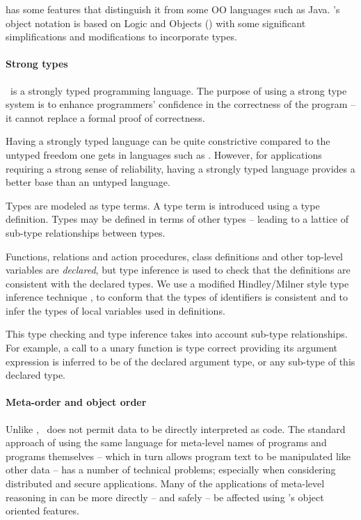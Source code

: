 \go has some features that distinguish it from some OO languages such as Java\tm. \go's object notation is based on Logic and Objects (\cite{fgm:92}) with some significant simplifications and modifications to incorporate types. 

\paragraph{Strong types}
\go\ is a strongly typed programming language. The purpose of using a strong type system is to enhance programmers' confidence in the correctness of the program -- it cannot replace a formal proof of correctness.

Having a strongly typed language can be quite constrictive compared to the untyped freedom one gets in languages such as \prolog.  However, for applications requiring a strong sense of reliability, having a strongly typed language provides a better base than an untyped language.

Types are modeled as type terms. A type term is introduced using a type definition. Types may be defined in terms of other types -- leading to a lattice of sub-type relationships between types. 

Functions, relations and action procedures, class definitions and other top-level variables are \emph{declared}, but type inference is used to check that the definitions are consistent with the declared types. We use a modified Hindley/Milner style type inference technique \cite{hindley:69}, \cite{milner:78} to conform that the types of identifiers is consistent and to infer the types of local variables used in definitions.

This type checking and type inference takes into account sub-type relationships.  For example, a call to a unary function is type correct providing its argument expression  is inferred to be of the declared argument  type, or any sub-type of this  declared type.

\paragraph{Meta-order and object order}
Unlike \prolog, \go\ does not permit data to be directly interpreted as code. The standard \prolog approach of using the same language for meta-level names of programs and programs themselves -- which in turn allows program text to be manipulated like other data -- has a number of technical problems; especially when considering distributed and secure applications. Many of the applications of meta-level reasoning in \prolog can be more directly -- and safely -- be affected using \go's object oriented features.

